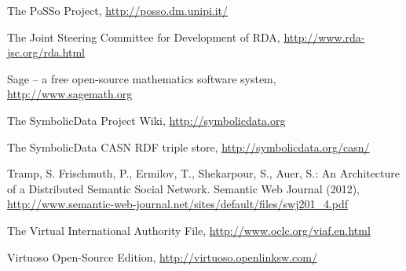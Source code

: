 \documentclass{svmult}
\begin{document}
\begin{thebibliography}{1}
 The PoSSo Project, \url{http://posso.dm.unipi.it/}

 The Joint Steering Committee for Development of RDA, 
  \url{http://www.rda-jsc.org/rda.html}

 Sage -- a free open-source mathematics software system, 
  \url{http://www.sagemath.org} 

 The SymbolicData Project Wiki, \url{http://symbolicdata.org}

 The SymbolicData CASN RDF triple store, 
  \url{http://symbolicdata.org/casn/} 

 Tramp, S. Frischmuth, P., Ermilov, T., Shekarpour, S., Auer,
  S.: An Architecture of a Distributed Semantic Social Network.  Semantic Web
  Journal (2012),
  \url{http://www.semantic-web-journal.net/sites/default/files/swj201_4.pdf} 

 The Virtual International Authority File,
  \url{http://www.oclc.org/viaf.en.html}

 Virtuoso Open-Source Edition,
  \url{http://virtuoso.openlinksw.com/}

\end{thebibliography}
\end{document}
